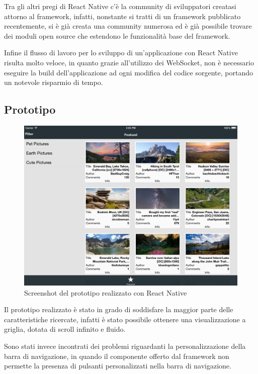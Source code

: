 Tra gli altri pregi di React Native c'è la community di sviluppatori creatasi attorno al framework, infatti, nonstante si tratti di un framework pubblicato recentemente, si è già creata una community numerosa ed è già possibile trovare dei moduli open source che estendono le funzionalità base del framework.

Infine il flusso di lavoro per lo sviluppo di un'applicazione con React Native risulta molto veloce, in quanto grazie all'utilizzo dei WebSocket, non è necessario eseguire la build dell'applicazione ad ogni modifica del codice sorgente, portando un notevole risparmio di tempo.

\subsection{Prototipo}

\begin{figure}[htp]
\centering
\includegraphics[width=\textwidth]{../immagini/prototipo-react-native}
\caption{Screenshot del prototipo realizzato con React Native}  
\end{figure}

Il prototipo realizzato è stato in grado di soddisfare la maggior parte delle caratteristiche ricercate, infatti è stato possibile ottenere una visualizzazione a griglia, dotata di scroll infinito e fluido.

Sono stati invece incontrati dei problemi riguardanti la personalizzazione della barra di navigazione, in quando il componente offerto dal framework non permette la presenza di pulsanti personalizzati nella barra di navigazione.

